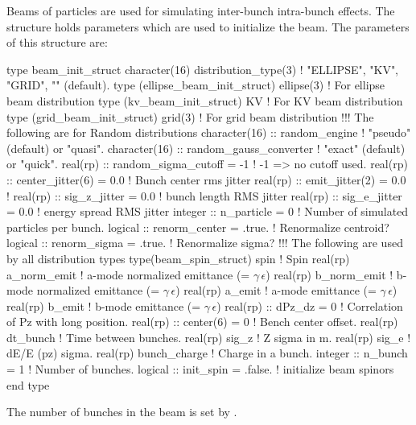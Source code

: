 Beams of particles are used for simulating inter-bunch intra-bunch effects.
The  structure holds parameters which are used to initialize
the beam. The parameters of this structure are:
\begin{example}
  type beam_init_struct
    character(16) distribution_type(3)         ! "ELLIPSE", "KV", "GRID", "" (default).
    type (ellipse_beam_init_struct) ellipse(3) ! For ellipse beam distribution
    type (kv_beam_init_struct) KV              ! For KV beam distribution
    type (grid_beam_init_struct) grid(3)       ! For grid beam distribution
    !!! The following are for Random distributions
    character(16) :: random_engine          ! "pseudo" (default) or "quasi". 
    character(16) :: random_gauss_converter ! "exact" (default) or "quick". 
    real(rp) :: random_sigma_cutoff = -1    ! -1 => no cutoff used.
    real(rp) :: center_jitter(6) = 0.0  ! Bunch center rms jitter
    real(rp) :: emit_jitter(2)   = 0.0  ! %
    real(rp) :: sig_z_jitter     = 0.0  ! bunch length RMS jitter 
    real(rp) :: sig_e_jitter     = 0.0  ! energy spread RMS jitter 
    integer :: n_particle = 0           ! Number of simulated particles per bunch.
    logical :: renorm_center = .true.   ! Renormalize centroid?
    logical :: renorm_sigma = .true.    ! Renormalize sigma?
    !!! The following are used  by all distribution types
    type(beam_spin_struct) spin     ! Spin
    real(rp) a_norm_emit            ! a-mode normalized emittance (= \(\gamma \, \epsilon\))
    real(rp) b_norm_emit            ! b-mode normalized emittance (= \(\gamma \, \epsilon\))
    real(rp) a_emit                 ! a-mode emittance (= \(\gamma \, \epsilon\))
    real(rp) b_emit                 ! b-mode emittance (= \(\gamma \, \epsilon\))
    real(rp) :: dPz_dz = 0          ! Correlation of Pz with long position.
    real(rp) :: center(6) = 0       ! Bench center offset.
    real(rp) dt_bunch               ! Time between bunches.
    real(rp) sig_z                  ! Z sigma in m.
    real(rp) sig_e                  ! dE/E (pz) sigma.
    real(rp) bunch_charge           ! Charge in a bunch.
    integer :: n_bunch = 1          ! Number of bunches.
    logical :: init_spin = .false.  ! initialize beam spinors
  end type
\end{example}
The number of bunches in the beam is set by . 
